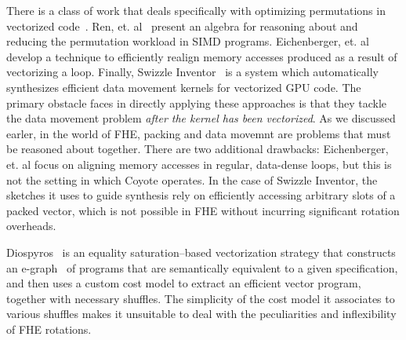There is a class of work that deals specifically with optimizing permutations in vectorized code~\cite{SIMDPermutations,SIMDAlignment,SwizzleInventor}. 
Ren, et. al~\cite{SIMDPermutations} present an algebra for reasoning about and reducing the permutation workload in SIMD programs.
Eichenberger, et. al~\cite{SIMDAlignment} develop a technique to efficiently realign memory accesses produced as a result of vectorizing a loop.
Finally, Swizzle Inventor~\cite{SwizzleInventor} is a system which automatically synthesizes efficient data movement kernels for vectorized GPU code.
The primary obstacle \system faces in directly applying these approaches is that they tackle the data movement problem {\em after the kernel has been vectorized}.
As we discussed earler, in the world of FHE, packing and data movemnt are problems that must be reasoned about together.
There are two additional drawbacks: Eichenberger, et. al focus on aligning memory accesses in regular, data-dense loops, but this is not the setting in which Coyote operates.
In the case of Swizzle Inventor, the sketches it uses to guide synthesis rely on efficiently accessing arbitrary slots of a packed vector, which is not possible in FHE without incurring significant rotation overheads.



Diospyros~\cite{Diospyros} is an equality saturation--based vectorization strategy that constructs an e-graph~\cite{EqualitySaturation, egg} of programs that are semantically equivalent to a given specification, and then uses a custom cost model to extract an efficient vector program, together with necessary shuffles.
The simplicity of the cost model it associates to various shuffles makes it unsuitable to deal with the peculiarities and inflexibility of FHE rotations.

